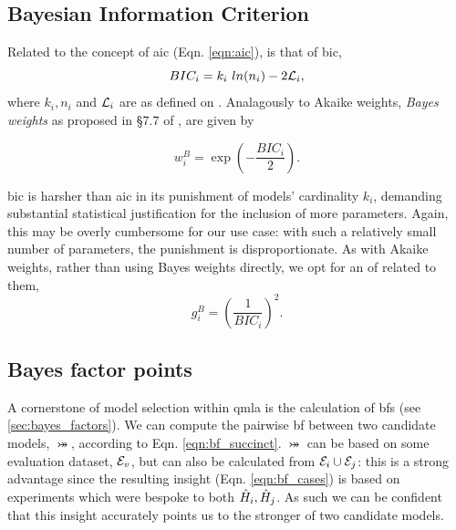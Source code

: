 \par 

\subsection{Bayesian Information Criterion}\label{sec:bayes_info_criterion}
Related to the concept of \gls{aic} (Eqn. \ref{eqn:aic}), is that of \gls{bic}, 
\begin{equation}
    \label{eqn:bic}
    BIC_i = k_i \ ln(n_i) - 2 {\mathcal{L}}_{i},
\end{equation}
    where $k_i, n_i$ and ${\mathcal{L}}_i$ are as defined on .
Analagously to Akaike weights, 
    \emph{Bayes weights} as proposed in \S7.7 of \cite{friedman2001elements}, are given by

\begin{equation}
    w_i^B = \exp\left( - \frac{BIC_i}{2}  \right).
\end{equation}

\gls{bic} is harsher than \gls{aic} in its punishment of models' cardinality $k_i$, 
    demanding substantial statistical justification for the inclusion of more parameters. 
Again, this may be overly cumbersome for our use case:
    with such a relatively small number of parameters, 
    the punishment is disproportionate.
As with Akaike weights, rather than using Bayes weights directly, 
    we opt for an \gls{of} related to them, 
\begin{equation}
    \label{eqn:bic_fitness}
    g_i^B = \left( \frac{1}{BIC_i}\right)^2.
\end{equation}
    

\subsection{Bayes factor points}\label{sec:bf_points}
A cornerstone of model selection within \gls{qmla} is the calculation of \glspl{bf} (see \cref{sec:bayes_factors}). 
We can compute the pairwise \gls{bf} between two candidate models, $\bij$, according to Eqn. \ref{eqn:bf_succinct}.
$\bij$ can be based on some evaluation dataset, ${ \mathcal{E} }_v$, but can also be calculated from ${ \mathcal{E} }_i \cup { \mathcal{E} }_j$: 
    this is a strong advantage since the resulting insight (Eqn. \ref{eqn:bf_cases}) is based on 
    experiments which were bespoke to both $\hat{H}_i, \hat{H}_j$. 
As such we can be confident that this insight accurately points us to the stronger of two candidate models. 
\par 


